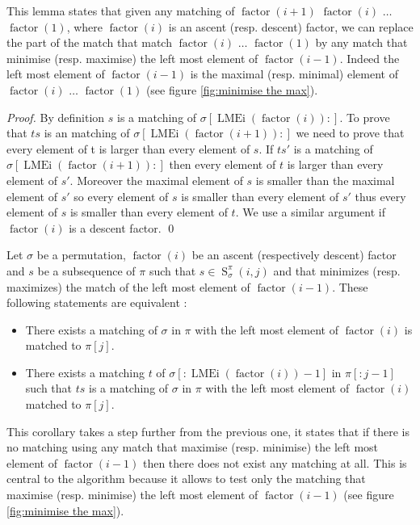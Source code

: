 \documentclass[a4paper]{llncs}
\newcommand{\ptext}{\pi}
\newcommand{\ppattern}{\sigma}
\DeclareMathOperator{\LMEi}{LMEi}
\DeclareMathOperator{\factor}{factor}
\DeclareMathOperator{\SETa}{S}
\newcommand{\SET}[4]{\SETa_{{#1}}^{{#2}}({#3},{#4})}
\begin{document}
This lemma states that given any matching of $\factor(i+1)$ $\factor(i)$ $\ldots$ $\factor(1)$,
where $\factor(i)$ is an ascent (resp. descent) factor,
we can replace the part of the match that match $\factor(i)$ $\ldots$ $\factor(1)$ by any match
that minimise (resp. maximise) the left most element of $\factor(i-1)$. Indeed the left most element of $\factor(i-1)$ is the maximal (resp. minimal) element of  $\factor(i)$ $\ldots$ $\factor(1)$ (see figure \ref{fig:minimise the max}). 

\begin{proof}
By definition $s$ is a matching of $\ppattern[\LMEi(\factor(i)):]$. To prove that $ts$ is an matching of $\ppattern[\LMEi(\factor(i+1)):]$ we need to prove that every element of t is larger than every element of $s$. If $ts'$ is a matching of $\ppattern[\LMEi(\factor(i+1)):]$ then every element of $t$ is larger than every element of $s'$. Moreover the maximal element of $s$ is smaller than  the maximal element of $s'$ so every element of $s$ is smaller than every element of $s'$ thus every element of $s$ is smaller than every element of $t$. We use a similar argument if $\factor(i)$ is a descent factor.
\qed
\end{proof}

\begin{corollary}
\label{corollary:we can chose a matching}	
Let $\ppattern$ be a permutation, 
$\factor(i)$ be an ascent (respectively descent) factor
and 
$s$ be a subsequence of $\pi$ such that $s \in \SET{\ppattern}{\ptext}{i}{j}$ and
that minimizes (resp. maximizes) the match of the left most element of $\factor(i-1)$.
These following statements are equivalent :
\begin{itemize}
	\item There exists a 
	matching of $\ppattern$ in $\ptext$ with the left most element of $\factor(i)$ is matched to $\ptext[j]$.
	\item There exists a matching $t$ of $\sigma[:\LMEi(\factor(i))-1]$ in $\ptext[:j-1]$  such that $ts$ is a matching of $\ppattern$ in $\ptext$ with the left most element of $\factor(i)$ matched to $\ptext[j]$.
\end{itemize}
\end{corollary}

This corollary takes a step further from the previous one, it states that if there is no matching using any match that maximise (resp. minimise) the left most element of $\factor(i-1)$ then there does not exist any matching at all. This is central to the algorithm because it allows to test only the matching that  maximise (resp. minimise) the left most element of $\factor(i-1)$ (see figure \ref{fig:minimise the max}).
\end{document}
